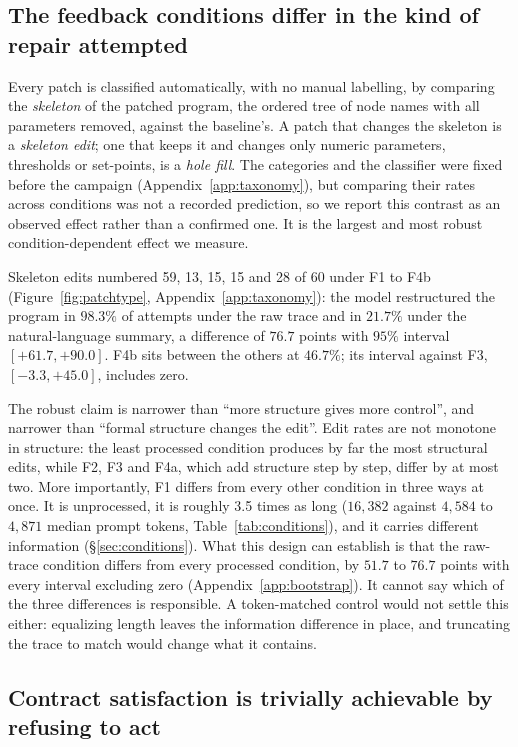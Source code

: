 \documentclass{article}
\begin{document}
\subsection{The feedback conditions differ in the kind of repair attempted}
\label{sec:patchtype}

Every patch is classified automatically, with no manual labelling, by comparing
the \emph{skeleton} of the patched program, the ordered tree of node names with
all parameters removed, against the baseline's. A patch that changes the
skeleton is a \emph{skeleton edit}; one that keeps it and changes only numeric
parameters, thresholds or set-points, is a \emph{hole fill}. The categories and
the classifier were fixed before the campaign (Appendix~\ref{app:taxonomy}), but
comparing their rates across conditions was not a recorded prediction, so we
report this contrast as an observed effect rather than a confirmed one. It is the
largest and most robust condition-dependent effect we measure.

Skeleton edits numbered 59, 13, 15, 15 and 28 of 60 under F1 to F4b
(Figure~\ref{fig:patchtype}, Appendix~\ref{app:taxonomy}): the model restructured the program in $98.3\%$ of
attempts under the raw trace and in $21.7\%$ under the natural-language summary,
a difference of $76.7$ points with $95\%$ interval $[+61.7,+90.0]$. F4b sits
between the others at $46.7\%$; its interval against F3, $[-3.3,+45.0]$,
includes zero.

The robust claim is narrower than ``more structure gives more control'', and
narrower than ``formal structure changes the edit''. Edit rates are not monotone
in structure: the least processed condition produces by far the most structural
edits, while F2, F3 and F4a, which add structure step by step, differ by at most
two. More importantly, F1
differs from every other condition in three ways at once. It is unprocessed, it
is roughly 3.5 times as long ($16{,}382$ against $4{,}584$ to $4{,}871$ median
prompt tokens, Table~\ref{tab:conditions}), and it carries different information
(\S\ref{sec:conditions}). What this design can establish is that the raw-trace
condition differs from every processed condition, by $51.7$ to $76.7$ points
with every interval excluding zero (Appendix~\ref{app:bootstrap}). It cannot
say which of the three differences is responsible. A token-matched control would not settle this
either: equalizing length leaves the information difference in place, and
truncating the trace to match would change what it contains.

\subsection{Contract satisfaction is trivially achievable by refusing to act}
\label{sec:refusal}
\end{document}
